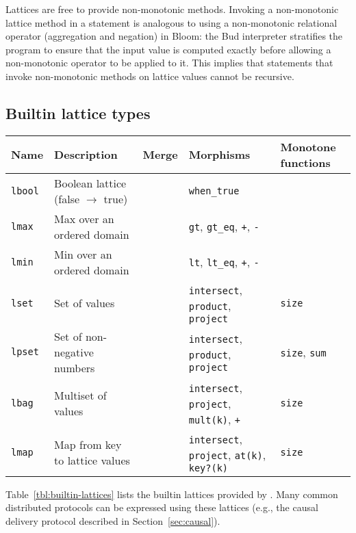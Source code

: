 Lattices are free to provide non-monotonic methods. Invoking a non-monotonic
lattice method in a statement is analogous to using a non-monotonic relational
operator (aggregation and negation) in Bloom: the Bud interpreter stratifies the
program to ensure that the input value is computed exactly before allowing a
non-monotonic operator to be applied to it. This implies that statements that
invoke non-monotonic methods on lattice values cannot be recursive.

\subsection{Builtin lattice types}
\label{sec:lattice-builtins}

\begin{table*}[t]
\begin{tabular}{|l|l|l|l|l|}
\hline
\textbf{Name} & \textbf{Description} & \textbf{Merge} & \textbf{Morphisms} &
\textbf{Monotone functions}\\
\hline
\texttt{lbool} & Boolean lattice (false $\to$ true) & & \texttt{when\_true} & \\
\texttt{lmax} & Max over an ordered domain & &\texttt{gt},
\texttt{gt\_eq}, \texttt{+}, \texttt{-} & \\
\texttt{lmin} & Min over an ordered domain & &\texttt{lt}, \texttt{lt\_eq},
\texttt{+}, \texttt{-} & \\
\texttt{lset} & Set of values & & \texttt{intersect}, \texttt{product},
\texttt{project} & \texttt{size} \\
\texttt{lpset} & Set of non-negative numbers & &
\texttt{intersect}, \texttt{product}, \texttt{project}& \texttt{size}, \texttt{sum} \\
\texttt{lbag} & Multiset of values & & \texttt{intersect},
\texttt{project}, \texttt{mult(k)}, \texttt{+} & \texttt{size}\\
\texttt{lmap} & Map from key to lattice values & &
\texttt{intersect}, \texttt{project}, \texttt{at(k)}, \texttt{key?(k)} & \texttt{size}\\
\hline
\end{tabular}
\caption{Builtin lattices in \lang.}
\label{tbl:builtin-lattices}
\end{table*}

Table~\ref{tbl:builtin-lattices} lists the builtin lattices provided by
\lang. Many common distributed protocols can be expressed using these lattices
(e.g., the causal delivery protocol described in Section~\ref{sec:causal}).

